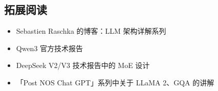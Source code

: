 \documentclass[a4paper]{article}
\begin{document}
\subsection{拓展阅读}

\begin{itemize}
  \item Sebastien Raschka 的博客：LLM 架构详解系列
  \item Qwen3 官方技术报告
  \item DeepSeek V2/V3 技术报告中的 MoE 设计
  \item 「Post NOS Chat GPT」系列中关于 LLaMA 2、GQA 的讲解
\end{itemize}

\end{document}
